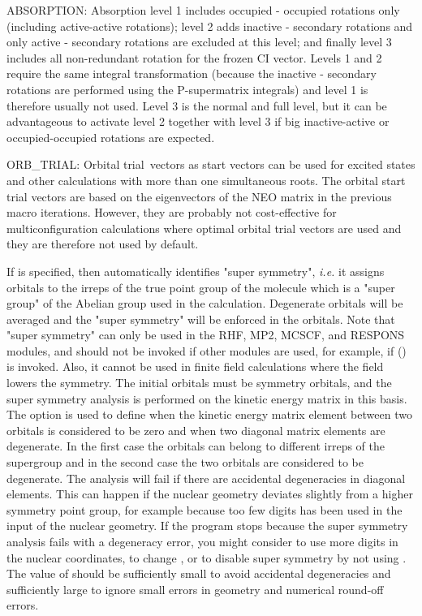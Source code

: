 ABSORPTION: Absorption level 1 includes occupied - occupied rotations
only (including active-active rotations); level 2 adds inactive -
secondary rotations and only active - secondary rotations are excluded
at this level; and finally level 3 includes all non-redundant rotation
for the frozen CI vector.  Levels 1 and 2 require the same integral
transformation (because the inactive - secondary rotations are
performed using the P-supermatrix integrals) and level 1 is therefore
usually not used. Level 3 is the normal and full level, but it can be
advantageous to activate level 2 together with level 3 if big
inactive-active or occupied-occupied rotations are expected.

ORB\_TRIAL: Orbital trial\ vectors as
start vectors can be used for
excited states and other calculations with more than one simultaneous
roots.  The orbital start trial vectors are based on the eigenvectors of
the NEO matrix in the previous macro iterations.  However, they are
probably not cost-effective for multiconfiguration calculations where
optimal orbital trial vectors are
used and they are therefore not used
by default.

If  is specified, then
{\sir} automatically identifies "super symmetry",
{\it i.e.\/} it assigns orbitals to the irreps of the true point
group of the molecule which is a
"super group" of the Abelian group used in the calculation.
Degenerate orbitals will be averaged and the "super symmetry"
will be enforced in the orbitals.
Note that "super symmetry" can only be used
in the RHF, MP2, MCSCF, and RESPONS modules, and should
not be invoked if other modules are used,
for example, if  (\aba) is invoked.
Also, it cannot be used
in finite field calculations where the field lowers the symmetry.
The initial orbitals must be symmetry orbitals, and the super symmetry
analysis is performed on the kinetic energy matrix in this basis.
The  option is used to define when the kinetic
energy matrix element between two orbitals is considered to be
zero and when two diagonal matrix elements are degenerate. In the
first case the orbitals can belong to different irreps of the
supergroup and in the second case the two orbitals are considered
to be degenerate. The analysis will fail if there are accidental
degeneracies in diagonal elements.  This can happen if the nuclear
geometry deviates slightly from a higher symmetry point group, for
example because too few digits has been used in the input of the
nuclear geometry. If the program stops because the super symmetry
analysis fails with a degeneracy error, you might consider to use
more digits in the nuclear coordinates, to change , or
to disable super symmetry by not using .  The value of
 should be sufficiently small to avoid accidental
degeneracies and sufficiently large to ignore small errors in
geometry and numerical round-off errors.


